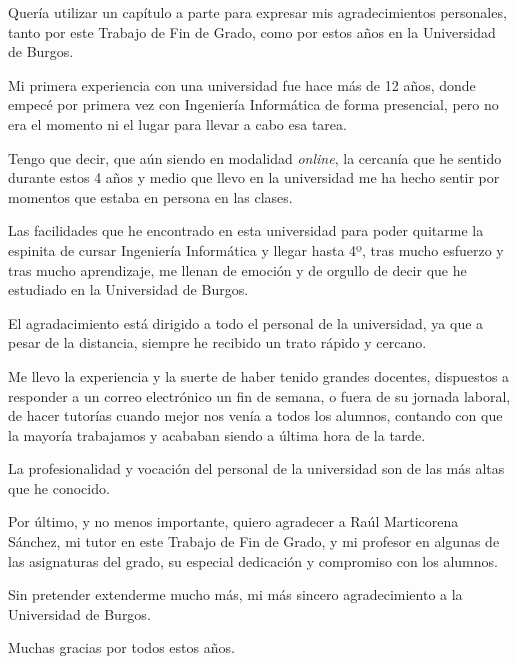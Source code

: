 
Quería utilizar un capítulo a parte para expresar mis agradecimientos personales, tanto por este Trabajo de Fin de Grado, como por estos años en la Universidad de Burgos.

Mi primera experiencia con una universidad fue hace más de 12 años, donde empecé por primera vez con Ingeniería Informática de forma presencial, pero no era el momento ni el lugar para llevar a cabo esa tarea.

Tengo que decir, que aún siendo en modalidad \textit{online}, la cercanía que he sentido durante estos 4 años y medio que llevo en la universidad me ha hecho sentir por momentos que estaba en persona en las clases.

Las facilidades que he encontrado en esta universidad para poder quitarme la espinita de cursar Ingeniería Informática y llegar hasta 4º, tras mucho esfuerzo y tras mucho aprendizaje, me llenan de emoción y de orgullo de decir que he estudiado en la Universidad de Burgos.

El agradacimiento está dirigido a todo el personal de la universidad, ya que a pesar de la distancia, siempre he recibido un trato rápido y cercano.

Me llevo la experiencia y la suerte de haber tenido grandes docentes, dispuestos a responder a un correo electrónico un fin de semana, o fuera de su jornada laboral, de hacer tutorías cuando mejor nos venía a todos los alumnos, contando con que la mayoría trabajamos y acababan siendo a última hora de la tarde.

La profesionalidad y vocación del personal de la universidad son de las más altas que he conocido.

Por último, y no menos importante, quiero agradecer a Raúl Marticorena Sánchez, mi tutor en este Trabajo de Fin de Grado, y mi profesor en algunas de las asignaturas del grado, su especial dedicación y compromiso con los alumnos.

Sin pretender extenderme mucho más, mi más sincero agradecimiento a la Universidad de Burgos.

Muchas gracias por todos estos años.


